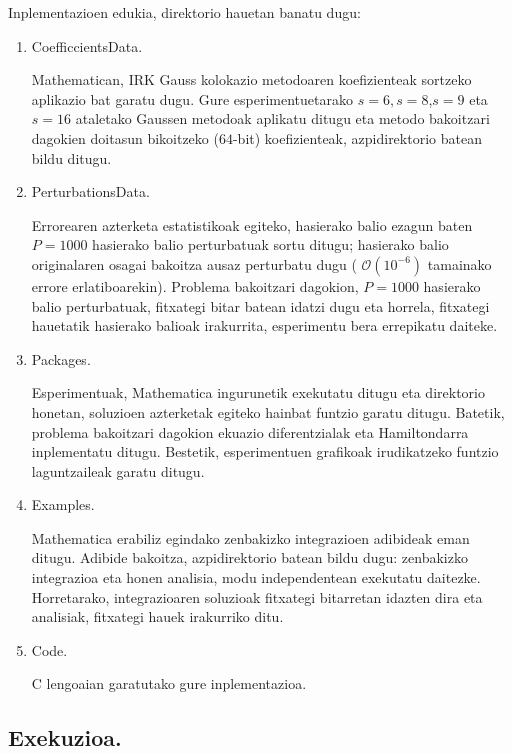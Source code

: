 Inplementazioen edukia, direktorio hauetan banatu dugu:
\begin{enumerate}

\item CoefficcientsData.

Mathematican, IRK Gauss kolokazio metodoaren koefizienteak sortzeko aplikazio bat garatu dugu. Gure esperimentuetarako $s=6,s=8$,$s=9$ eta $s=16$ ataletako Gaussen metodoak aplikatu ditugu eta metodo bakoitzari dagokien doitasun bikoitzeko ($64$-bit) koefizienteak, azpidirektorio batean bildu ditugu.

\item PerturbationsData.

Errorearen azterketa estatistikoak egiteko, hasierako balio ezagun baten $P=1000$ hasierako balio perturbatuak sortu ditugu; hasierako balio originalaren osagai bakoitza ausaz perturbatu dugu ( $\mathcal{O}(10^{-6})$ tamainako errore erlatiboarekin). Problema bakoitzari dagokion, $P=1000$ hasierako balio perturbatuak, fitxategi bitar batean idatzi dugu eta horrela, fitxategi hauetatik hasierako balioak  irakurrita, esperimentu bera errepikatu daiteke.

\item Packages.

Esperimentuak, Mathematica ingurunetik exekutatu ditugu eta direktorio honetan, soluzioen azterketak egiteko hainbat funtzio garatu ditugu. Batetik, problema bakoitzari dagokion ekuazio diferentzialak eta Hamiltondarra inplementatu ditugu. Bestetik, esperimentuen grafikoak irudikatzeko funtzio laguntzaileak garatu ditugu. 

\item Examples.

Mathematica erabiliz egindako zenbakizko integrazioen adibideak eman ditugu. Adibide bakoitza, azpidirektorio batean bildu dugu: zenbakizko integrazioa eta honen analisia, modu independentean exekutatu daitezke. Horretarako, integrazioaren soluzioak fitxategi bitarretan idazten dira eta analisiak, fitxategi hauek irakurriko ditu.       

\item Code.

C lengoaian garatutako gure inplementazioa. 

\end{enumerate}

\subsection*{Exekuzioa.}

